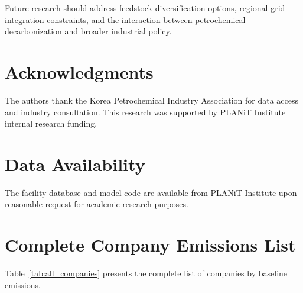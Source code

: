 \documentclass[12pt,a4paper]{article}
\begin{document}
Future research should address feedstock diversification options, regional grid integration constraints, and the interaction between petrochemical decarbonization and broader industrial policy.

\section*{Acknowledgments}

The authors thank the Korea Petrochemical Industry Association for data access and industry consultation. This research was supported by PLANiT Institute internal research funding.

\section*{Data Availability}

The facility database and model code are available from PLANiT Institute upon reasonable request for academic research purposes.

\newpage


\newpage
\appendix

\section{Complete Company Emissions List}

Table~\ref{tab:all_companies} presents the complete list of companies by baseline emissions.
\end{document}
